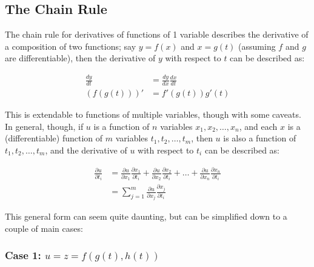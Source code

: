 \documentclass[12pt]{article}
\begin{document}


\subsection{The Chain Rule}

The chain rule for derivatives of functions of 1 variable describes the derivative of a composition of two functions; say $y=f(x)$ and $x=g(t)$ (assuming $f$ and $g$ are differentiable), then the derivative of $y$ with respect to $t$ can be described as:

\begin{equation}
    \begin{split}
       \frac{dy}{dt} &= \frac{dy}{dx}\frac{dx}{dt}\\
        (f(g(t)))' &= f'(g(t))g'(t)
    \end{split}
\end{equation}

This is extendable to functions of multiple variables, though with some caveats. In general, though, if $u$ is a function of $n$ variables $x_1, x_2, \dots, x_n$, and each $x$ is a (differentiable) function of $m$ variables $t_1, t_2, \dots, t_m$, then $u$ is also a function of $t_1, t_2, \dots, t_m$, and the derivative of $u$ with respect to $t_i$ can be described as:

\begin{equation}
    \begin{split}
        \frac{\partial u}{\partial t_i} &= \frac{\partial u}{\partial x_1}\frac{\partial x_1}{\partial t_i} + \frac{\partial u}{\partial x_2}\frac{\partial x_2}{\partial t_i} + \dots + \frac{\partial u}{\partial x_n}\frac{\partial x_n}{\partial t_i}\\
        &= \sum_{j=1}^m \frac{\partial u}{\partial x_j}\frac{\partial x_j}{\partial t_i}
    \end{split}
\end{equation}

This general form can seem quite daunting, but can be simplified down to a couple of main cases:

\subsubsection*{\texorpdfstring{Case 1: $u=z=f(g(t),h(t))$}{TEXT}}
\end{document}
